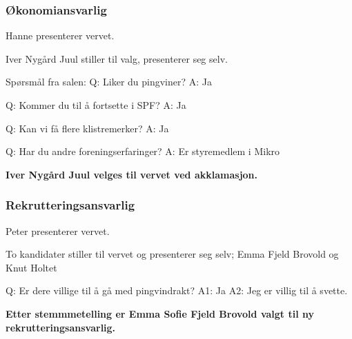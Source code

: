 \documentclass[10pt,norsk,a4paper,usenames,dvipsnames]{article}
\begin{document}
\begin{multicols}{2}
        \subsubsection{Økonomiansvarlig}
        Hanne presenterer vervet.

        Iver Nygård Juul stiller til valg, presenterer seg selv.

        Spørsmål fra salen:
        Q: Liker du pingviner?
        A: Ja

        Q: Kommer du til å fortsette i SPF?
        A: Ja

        Q: Kan vi få flere klistremerker?
        A: Ja

        Q: Har du andre foreningserfaringer?
        A: Er styremedlem i Mikro

        \textbf{Iver Nygård Juul velges til vervet ved akklamasjon.}







        \subsubsection{Rekrutteringsansvarlig}

        Peter presenterer vervet.

        To kandidater stiller til vervet og presenterer seg selv; Emma Fjeld Brovold og Knut Holtet

        Q: Er dere villige til å gå med pingvindrakt?
        A1: Ja
        A2: Jeg er villig til å svette.

        \textbf{Etter stemmmetelling er Emma Sofie Fjeld Brovold valgt til ny rekrutteringsansvarlig.}




\end{multicols}
\end{document}

